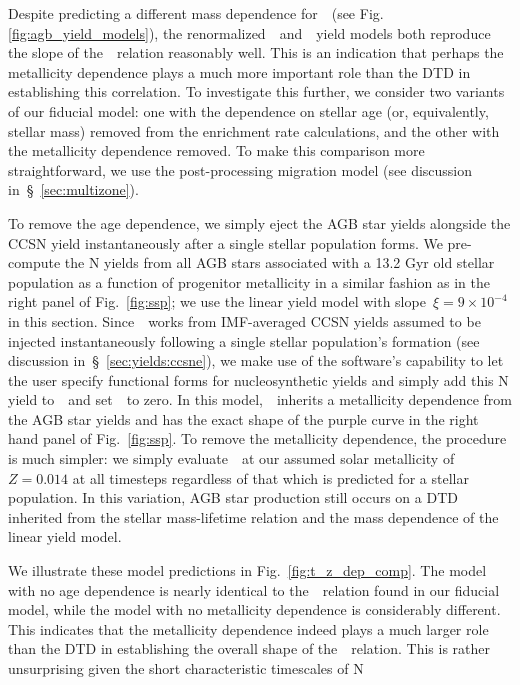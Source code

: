 \documentclass[ms.tex]{subfiles}
\begin{document}
Despite predicting a different mass dependence for~~(see Fig.
\ref{fig:agb_yield_models}), the renormalized~\cristallo~and~\ventura~yield
models both reproduce the slope of the~\ohno~relation reasonably well.
This is an indication that perhaps the metallicity dependence plays a much
more important role than the DTD in establishing this correlation.
To investigate this further, we consider two variants of our fiducial model:
one with the dependence on stellar age (or, equivalently, stellar mass)
removed from the enrichment rate calculations, and the other with the
metallicity dependence removed.
To make this comparison more straightforward, we use the post-processing
migration model (see discussion in~\S~\ref{sec:multizone}).
\par
To remove the age dependence, we simply eject the AGB star yields alongside
the CCSN yield instantaneously after a single stellar population forms.
We pre-compute the N yields from all AGB stars associated with a 13.2 Gyr old
stellar population as a function of progenitor metallicity in a similar fashion
as in the right panel of Fig.~\ref{fig:ssp}; we use the linear yield model with
slope~$\xi = 9\times10^{-4}$ in this section.
Since~\vice~works from IMF-averaged CCSN yields assumed to be injected
instantaneously following a single stellar population's formation (see
discussion in~\S~\ref{sec:yields:ccsne}), we make use of the software's
capability to let the user specify functional forms for nucleosynthetic yields
and simply add this N yield to~~and set~~to zero.
In this model,~~inherits a metallicity dependence from the AGB star
yields and has the exact shape of the purple curve in the right hand panel of
Fig.~\ref{fig:ssp}.
To remove the metallicity dependence, the procedure is much simpler: we simply
evaluate~~at our assumed solar metallicity of~$Z = 0.014$ at all
timesteps regardless of that which is predicted for a stellar population.
In this variation, AGB star production still occurs on a DTD inherited from
the stellar mass-lifetime relation and the mass dependence of the linear yield
model.
\par
We illustrate these model predictions in Fig.~\ref{fig:t_z_dep_comp}.
The model with no age dependence is nearly identical to the~\ohno~relation
found in our fiducial model, while the model with no metallicity dependence
is considerably different.
This indicates that the metallicity dependence indeed plays a much larger role
than the DTD in establishing the overall shape of the~\ohno~relation.
This is rather unsurprising given the short characteristic timescales of N
\end{document}
